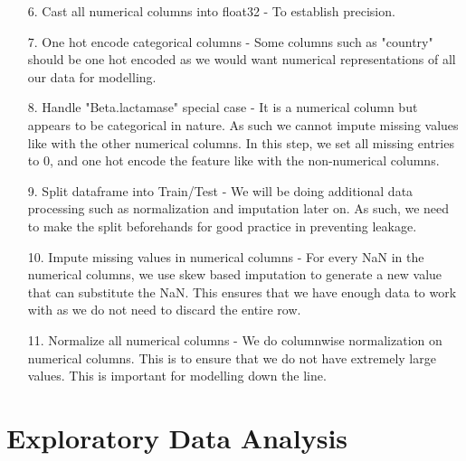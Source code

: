 \documentclass[manuscript,screen,review, nonacm]{acmart}
\begin{document}
\begin{itemize}
        \item[6.] Cast all numerical columns into float32 - To establish precision.
        \item[7.] One hot encode categorical columns - Some columns such as "country" should be one hot encoded as we would want
        numerical representations of all our data for modelling.
        \item[8.] Handle "Beta.lactamase" special case - It is a numerical column but appears to be categorical in nature. As such
        we cannot impute missing values like with the other numerical columns. In this step, we set all missing entries to 0, and
        one hot encode the feature like with the non-numerical columns.
        \item[9.] Split dataframe into Train/Test - We will be doing additional data processing such as normalization and imputation later on.
        As such, we need to make the split beforehands for good practice in preventing leakage.
        \item[10.] Impute missing values in numerical columns - For every NaN in the numerical columns, we use skew based imputation to
        generate a new value that can substitute the NaN. This ensures that we have enough data to work with as we do not need to discard the entire row.
        \item[11.] Normalize all numerical columns - We do columnwise normalization on numerical columns. This is to ensure that we do not have extremely
        large values. This is important for modelling down the line. 

    \end{itemize}



\section{Exploratory Data Analysis}
\end{document}
